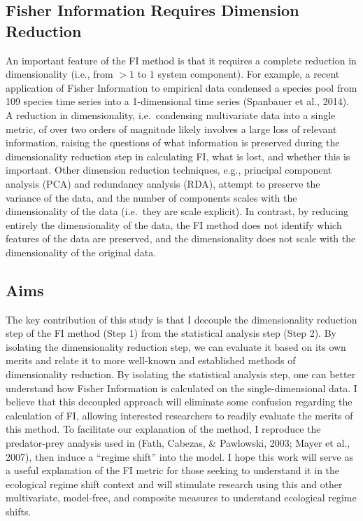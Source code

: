 \documentclass[12pt,twoside,openany]{reedthesis}
\begin{document}
\hypertarget{fisher-information-requires-dimension-reduction}{%
\subsection{Fisher Information Requires Dimension Reduction}\label{fisher-information-requires-dimension-reduction}}

An important feature of the FI method is that it requires a complete reduction in dimensionality (i.e., from \(>1\) to \(1\) system component). For example, a recent application of Fisher Information to empirical data condensed a species pool from 109 species time series into a 1-dimensional time series (Spanbauer et al., 2014). A reduction in dimensionality, i.e.~condensing multivariate data into a single metric, of over two orders of magnitude likely involves a large loss of relevant information, raising the questions of what information is preserved during the dimensionality reduction step in calculating FI, what is lost, and whether this is important. Other dimension reduction techniques, e.g., principal component analysis (PCA) and redundancy analysis (RDA), attempt to preserve the variance of the data, and the number of components scales with the dimensionality of the data (i.e.~they are scale explicit). In contrast, by reducing entirely the dimensionality of the data, the FI method does not identify which features of the data are preserved, and the dimensionality does not scale with the dimensionality of the original data.

\hypertarget{aims}{%
\subsection{Aims}\label{aims}}

The key contribution of this study is that I decouple the dimensionality reduction step of the FI method (Step 1) from the statistical analysis step (Step 2). By isolating the dimensionality reduction step, we can evaluate it based on its own merits and relate it to more well-known and established methods of dimensionality reduction. By isolating the statistical analysis step, one can better understand how Fisher Information is calculated on the single-dimensional data. I believe that this decoupled approach will eliminate some confusion regarding the calculation of FI, allowing interested researchers to readily evaluate the merits of this method. To facilitate our explanation of the method, I reproduce the predator-prey analysis used in (Fath, Cabezas, \& Pawlowski, 2003; Mayer et al., 2007), then induce a ``regime shift'' into the model. I hope this work will serve as a useful explanation of the FI metric for those seeking to understand it in the ecological regime shift context and will stimulate research using this and other multivariate, model-free, and composite measures to understand ecological regime shifts.
\end{document}
